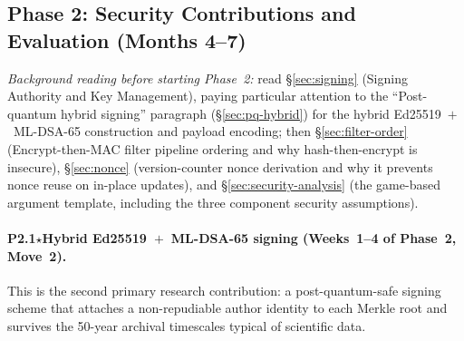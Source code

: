 \documentclass[11pt]{article}
\begin{document}
\subsection{Phase 2: Security Contributions and Evaluation (Months 4--7)}

\noindent\textit{Background reading before starting Phase~2:} read
\S\ref{sec:signing} (Signing Authority and Key Management), paying particular
attention to the ``Post-quantum hybrid signing'' paragraph (\S\ref{sec:pq-hybrid})
for the hybrid Ed25519~$+$~ML-DSA-65 construction and payload encoding; then
\S\ref{sec:filter-order} (Encrypt-then-MAC filter pipeline ordering and why
hash-then-encrypt is insecure), \S\ref{sec:nonce} (version-counter nonce
derivation and why it prevents nonce reuse on in-place updates), and
\S\ref{sec:security-analysis} (the game-based argument template, including the
three component security assumptions).

\paragraph{P2.1$\star$\enspace Hybrid Ed25519~$+$~ML-DSA-65 signing
(Weeks~1--4 of Phase~2, \textbf{Move~2}).}
This is the second primary research contribution: a post-quantum-safe signing
scheme that attaches a non-repudiable author identity to each Merkle root and
survives the 50-year archival timescales typical of scientific data.
\end{document}
